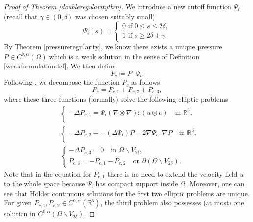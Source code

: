 \documentclass[12pt,a4paper]{article}
\theoremstyle{definition}
\theoremstyle{remark}
\numberwithin{equation}{section}
\begin{document}
\begin{proof}[Proof of Theorem \ref{doubleregularitythm}]
We introduce a new cutoff function $\Psi_i$ (recall that $\gamma \in (0,\delta)$ was chosen suitably small)
\begin{equation}
\Psi_i (s) = \begin{cases}
0 \text{ if } 0 \leq s \leq 2 \delta, \\
1 \text{ if } s \geq 2 \delta + \gamma.
\end{cases}
\end{equation}
By Theorem \ref{pressureregularity}, we know there exists a unique pressure $P \in C^{0,\alpha} (\Omega)$ which is a weak solution in the sense of Definition \ref{weakformulationdef}. We then define
\begin{equation*}
P_c \coloneqq P \cdot \Psi_i.
\end{equation*}
Following \cite[~Proof of Proposition 3.3]{titi2019}, we decompose the function $P_c$ as follows
\begin{equation*}
P_c = P_{c,1} + P_{c,2} + P_{c,3},
\end{equation*}
where these three functions (formally) solve the following elliptic problems
\begin{align}
&\begin{cases}
-\Delta P_{c,1} = \Psi_i (\nabla \otimes \nabla) : (u \otimes u) \quad \text{in } \mathbb{R}^3, \\
\end{cases} \label{interiorproblem1} \\
&\begin{cases}
-\Delta P_{c,2} = - (\Delta \Psi_i) P - 2 \nabla \Psi_i \cdot \nabla P \quad \text{in } \mathbb{R}^3, \\
\end{cases} \label{interiorproblem2} \\
&\begin{cases}
-\Delta P_{c,3} = 0 \quad \text{in } \Omega \backslash V_{2 \delta}, \\
P_{c,3} = - P_{c,1} - P_{c,2} \quad \text{on } \partial (\Omega \backslash V_{2 \delta}).
\end{cases} \label{interiorproblem3}
\end{align}
Note that in the equation for $P_{c,1}$ there is no need to extend the velocity field $u$ to the whole space because $\Psi_i$ has compact support inside $\Omega$. Moreover, one can see that Hölder continuous solutions for the first two elliptic problems are unique. For given $P_{c,1}, P_{c,2} \in C^{0,\alpha} (\mathbb{R}^3)$, the third problem also possesses (at most) one solution in $C^{0, \alpha} (\Omega \backslash V_{2 \delta})$. 


\end{proof}
\end{document}
